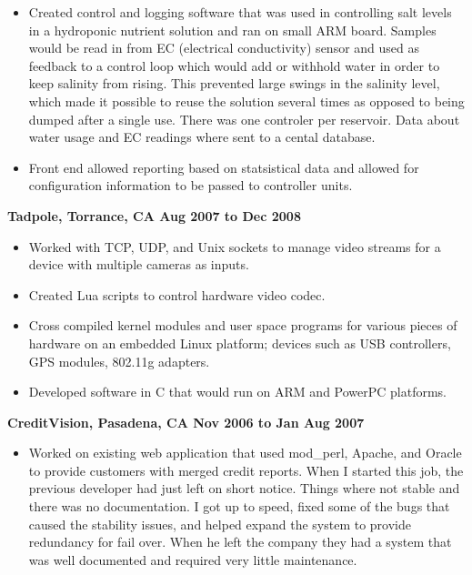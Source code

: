 \documentclass{res}
\begin{document}
\begin{resume}
\begin{itemize}
\item
	Created control and logging software that was used in controlling
	salt levels in a hydroponic nutrient solution and ran on
	small ARM board.  Samples would be read in from EC (electrical
	conductivity) sensor and used as feedback to a control loop which
	would add or withhold water in order to keep salinity from rising.
	This prevented large swings in the salinity level, which made
	it possible to reuse the solution several times as opposed to
	being dumped after a single use.  There was one controler per
	reservoir.  Data about water usage and EC readings where sent
	to a cental database.

\item
	Front end allowed reporting based on statsistical data and allowed
	for configuration information to be passed to controller units.

\end{itemize}

{\large \bf Tadpole, Torrance, CA \hfill Aug 2007 to Dec 2008}

\begin{itemize}

\item
	Worked with TCP, UDP, and Unix sockets to manage video streams
	for a device with multiple cameras as inputs.

\item
	Created Lua scripts to control hardware video codec.

\item
	Cross compiled kernel modules and user space programs for various
	pieces of hardware on an embedded Linux platform; devices such
	as USB controllers, GPS modules, 802.11g adapters.

\item
	Developed software in C that would run on ARM and PowerPC platforms.

\end{itemize}

{\large \bf CreditVision, Pasadena, CA \hfill Nov 2006 to Jan Aug 2007}

\begin{itemize}

\item
	Worked on existing web application that used mod\_perl, Apache,
	and Oracle to provide customers with merged credit reports.
	When I started this job, the previous developer had just
	left on short notice.  Things where not stable and there was
	no documentation.  I got up to speed, fixed some of the bugs
	that caused the stability issues, and helped expand the system
	to provide redundancy for fail over.  When he left the company
	they had a system that was well documented and required very
	little maintenance.


\end{itemize}
\end{resume}
\end{document}

